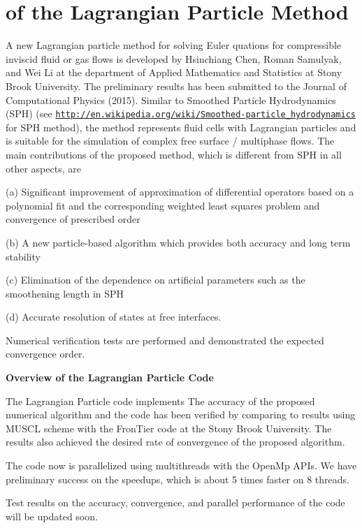 \hypertarget{123_Overview}{}\section{of the Lagrangian Particle Method}\label{123_Overview}
A new Lagrangian particle method for solving Euler quations for compressible inviscid fluid or gas flows is developed by Hsinchiang Chen, Roman Samulyak, and Wei Li at the department of Applied Mathematics and Statistics at Stony Brook University. The preliminary results has been submitted to the Journal of Computational Physics (2015). Similar to Smoothed Particle Hydrodynamics (S\-P\-H) (see \href{http://en.wikipedia.org/wiki/Smoothed-particle_hydrodynamics}{\tt http\-://en.\-wikipedia.\-org/wiki/\-Smoothed-\/particle\-\_\-hydrodynamics} for S\-P\-H method), the method represents fluid cells with Lagrangian particles and is suitable for the simulation of complex free surface / multiphase flows. The main contributions of the proposed method, which is different from S\-P\-H in all other aspects, are\par
(a) Significant improvement of approximation of differential operators based on a polynomial fit and the corresponding weighted least squares problem and convergence of prescribed order\par
 (b) A new particle-\/based algorithm which provides both accuracy and long term stability\par
 (c) Elimination of the dependence on artificial parameters such as the smoothening length in S\-P\-H\par
 (d) Accurate resolution of states at free interfaces.\par
Numerical verification tests are performed and demonstrated the expected convergence order.\par
 {\bfseries  Overview of the Lagrangian Particle Code }\par
 The Lagrangian Particle code implements The accuracy of the proposed numerical algorithm and the code has been verified by comparing to results using M\-U\-S\-C\-L scheme with the Fron\-Tier code at the Stony Brook University. The results also achieved the desired rate of convergence of the proposed algorithm.\par


The code now is parallelized using multithreads with the Open\-Mp A\-P\-Is. We have preliminary success on the speedups, which is about 5 times faster on 8 threads.\par
 Test results on the accuracy, convergence, and parallel performance of the code will be updated soon.

